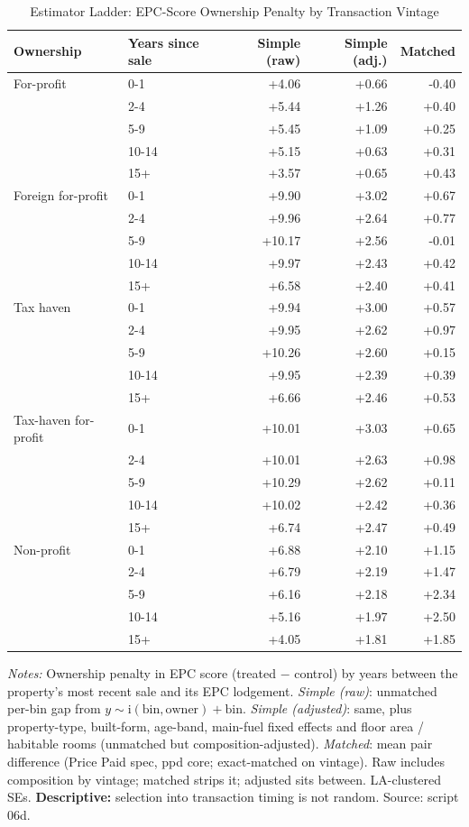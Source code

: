\begin{table}[htbp]
\centering
\caption{Estimator Ladder: EPC-Score Ownership Penalty by Transaction Vintage}
\label{tab:txn_vintage_simple}
\small
\begin{tabular}{llrrr}
\toprule
Ownership & Years since sale & Simple (raw) & Simple (adj.) & Matched \\
\midrule
For-profit & 0-1 & +4.06 & +0.66 & -0.40 \\
 & 2-4 & +5.44 & +1.26 & +0.40 \\
 & 5-9 & +5.45 & +1.09 & +0.25 \\
 & 10-14 & +5.15 & +0.63 & +0.31 \\
 & 15+ & +3.57 & +0.65 & +0.43 \\
\midrule
Foreign for-profit & 0-1 & +9.90 & +3.02 & +0.67 \\
 & 2-4 & +9.96 & +2.64 & +0.77 \\
 & 5-9 & +10.17 & +2.56 & -0.01 \\
 & 10-14 & +9.97 & +2.43 & +0.42 \\
 & 15+ & +6.58 & +2.40 & +0.41 \\
\midrule
Tax haven & 0-1 & +9.94 & +3.00 & +0.57 \\
 & 2-4 & +9.95 & +2.62 & +0.97 \\
 & 5-9 & +10.26 & +2.60 & +0.15 \\
 & 10-14 & +9.95 & +2.39 & +0.39 \\
 & 15+ & +6.66 & +2.46 & +0.53 \\
\midrule
Tax-haven for-profit & 0-1 & +10.01 & +3.03 & +0.65 \\
 & 2-4 & +10.01 & +2.63 & +0.98 \\
 & 5-9 & +10.29 & +2.62 & +0.11 \\
 & 10-14 & +10.02 & +2.42 & +0.36 \\
 & 15+ & +6.74 & +2.47 & +0.49 \\
\midrule
Non-profit & 0-1 & +6.88 & +2.10 & +1.15 \\
 & 2-4 & +6.79 & +2.19 & +1.47 \\
 & 5-9 & +6.16 & +2.18 & +2.34 \\
 & 10-14 & +5.16 & +1.97 & +2.50 \\
 & 15+ & +4.05 & +1.81 & +1.85 \\
\bottomrule
\end{tabular}
\begin{minipage}{0.95\textwidth}
\vspace{4pt}
\footnotesize
\textit{Notes:} Ownership penalty in EPC score (treated $-$ control) by years
between the property's most recent sale and its EPC lodgement. \emph{Simple (raw)}:
unmatched per-bin gap from $y \sim \mathrm{i}(\text{bin},\text{owner}) + \text{bin}$.
\emph{Simple (adjusted)}: same, plus property-type, built-form, age-band, main-fuel
fixed effects and floor area / habitable rooms (unmatched but composition-adjusted).
\emph{Matched}: mean pair difference (Price Paid spec, ppd core; exact-matched on
vintage). Raw includes composition by vintage; matched strips it; adjusted sits
between. LA-clustered SEs. \textbf{Descriptive:} selection into transaction timing is
not random. Source: script 06d.
\end{minipage}
\end{table}
